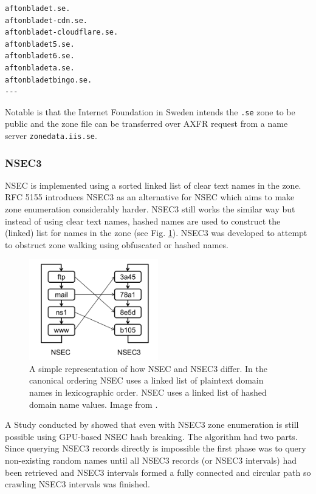 \begin{verbatim}
aftonbladet.se.
aftonbladet-cdn.se.
aftonbladet-cloudflare.se.
aftonbladet5.se.
aftonbladet6.se.
aftonbladeta.se.
aftonbladetbingo.se.
---
\end{verbatim}

Notable is that the Internet Foundation in Sweden \cite{sweden} intends the \texttt{.se} zone to be public and the zone file can be transferred over AXFR request from a name server \texttt{zonedata.iis.se}.

\subsubsection{NSEC3}
\label{sec:nsec3}
NSEC is implemented using a sorted linked list of clear text names in the zone.
RFC 5155 \cite{RFC5155} introduces NSEC3 as an alternative for NSEC which aims to make zone enumeration considerably harder. NSEC3 still works the similar way but instead of using clear text names, hashed names are used to construct the (linked) list for names in the zone (see Fig. \ref{fig:hash_list}). NSEC3 was developed to attempt to obstruct zone walking using obfuscated or hashed names.

\begin{figure}[htb]
  \begin{center}
    \includegraphics[width=0.5\textwidth]{nsec3.png}
    \caption{A simple representation of how NSEC and NSEC3 differ. In the canonical ordering NSEC uses a linked list of plaintext domain names in lexicographic order. NSEC uses a linked list of hashed domain name values. Image from \cite{NSEC3_hash_breaking}.} 
    \label{fig:hash_list}
  \end{center}
\end{figure}

A Study conducted by \citet{NSEC3_hash_breaking} showed that even with NSEC3 zone enumeration is still possible using GPU-based NSEC hash breaking. The algorithm had two parts. Since querying NSEC3 records directly is impossible the first phase was to query non-existing random names until all NSEC3 records (or NSEC3 intervals) had been retrieved and NSEC3 intervals formed a fully connected and circular path so crawling NSEC3 intervals was finished.



